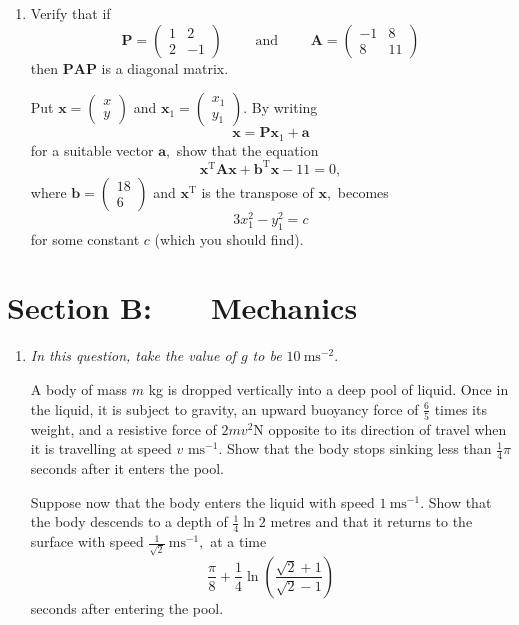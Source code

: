 \documentclass[a4, 11pt]{report}
\newlength{\qspace}
\newcounter{qnumber}
\newenvironment{question}%
 {\vspace{\qspace}
  \begin{enumerate}[\bfseries 1\quad][10]%
    \setcounter{enumi}{\value{qnumber}}%
    \item%
 }
{
  \end{enumerate}
  \filbreak
  \stepcounter{qnumber}
 }
\begin{document}
\begin{question}
Verify that if 
\[
\mathbf{P}=\begin{pmatrix}1 & 2\\
2 & -1
\end{pmatrix}\qquad\mbox{ and }\qquad\mathbf{A}=\begin{pmatrix}-1 & 8\\
8 & 11
\end{pmatrix}
\]
then $\mathbf{PAP}$ is a diagonal matrix. 


Put $\mathbf{x}=\begin{pmatrix}x\\
y
\end{pmatrix}$ and $\mathbf{x}_{1}=\begin{pmatrix}x_{1}\\
y_{1}
\end{pmatrix}.$ By writing 
\[
\mathbf{x}=\mathbf{P}\mathbf{x}_{1}+\mathbf{a}
\]
for a suitable vector $\mathbf{a},$ show that the equation 
\[
\mathbf{x}^{\mathrm{T}}\mathbf{Ax}+\mathbf{b}^{\mathrm{T}}\mathbf{x}-11=0,
\]
where $\mathbf{b}=\begin{pmatrix}18\\
6
\end{pmatrix}$ and $\mathbf{x}^{\mathrm{T}}$ is the transpose of $\mathbf{x},$
becomes 
\[
3x_{1}^{2}-y_{1}^{2}=c
\]
for some constant $c$ (which you should find). 
\end{question}
		
	
\newpage
\section*{Section B: \ \ \ Mechanics}


	
\begin{question}
\textit{In this question, take the value of $g$ to be $10\ \mathrm{ms}^{-2}.$}


A body of mass $m$ kg is dropped vertically into a deep pool of liquid.
Once in the liquid, it is subject to gravity, an upward buoyancy force
of $\frac{6}{5}$ times its weight, and a resistive force of $2mv^{2}\mathrm{N}$
opposite to its direction of travel when it is travelling at speed
$v$ $\mathrm{ms}^{-1}.$ Show that the body stops sinking less than
$\frac{1}{4}\pi$ seconds after it enters the pool. 


Suppose now that the body enters the liquid with speed $1\ \mathrm{ms}^{-1}.$
Show that the body descends to a depth of $\frac{1}{4}\ln2$ metres
and that it returns to the surface with speed $\frac{1}{\sqrt{2}}\ \mathrm{ms}^{-1},$
at a time 
\[
\frac{\pi}{8}+\frac{1}{4}\ln\left(\frac{\sqrt{2}+1}{\sqrt{2}-1}\right)
\]
seconds after entering the pool.
	\end{question}
	
\end{document}
